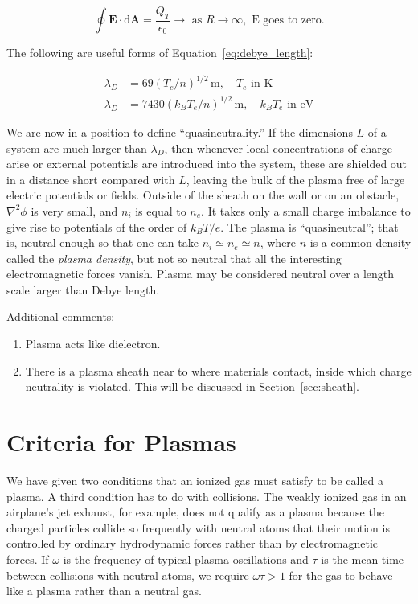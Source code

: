 \documentclass[
  notoc %
]{tufte-book}
\providecommand{\tightlist}{%
  \setlength{\itemsep}{0pt}\setlength{\parskip}{0pt}
}
\begin{document}
\[
\oint\mathbf{E}\cdot \mathrm{d}\mathbf{A}=\frac{Q_T}{\epsilon_0}\rightarrow\textrm{ as }R\rightarrow \infty, \textrm{ E goes to zero.}
\]

The following are useful forms of Equation~\ref{eq:debye_length}:

\[
\begin{aligned}
\lambda_D &= 69 (T_e/n)^{1/2}\,\text{m},\quad T_e \text{ in K} \\
\lambda_D &= 7430 (k_B T_e/n)^{1/2}\,\text{m},\quad k_BT_e \text{ in eV}
\end{aligned}
\]

We are now in a position to define ``quasineutrality.'' If the
dimensions \(L\) of a system are much larger than \(\lambda_D\), then
whenever local concentrations of charge arise or external potentials are
introduced into the system, these are shielded out in a distance short
compared with \(L\), leaving the bulk of the plasma free of large
electric potentials or fields. Outside of the sheath on the wall or on
an obstacle, \(\nabla^2\phi\) is very small, and \(n_i\) is equal to
\(n_e\). It takes only a small charge imbalance to give rise to
potentials of the order of \(k_BT/e\). The plasma is ``quasineutral'';
that is, neutral enough so that one can take \(n_i\simeq n_e\simeq n\),
where \(n\) is a common density called the \emph{plasma density}, but
not so neutral that all the interesting electromagnetic forces vanish.
Plasma may be considered neutral over a length scale larger than Debye
length.

Additional comments:

\begin{enumerate}
\def\labelenumi{\arabic{enumi}.}
\tightlist
\item
  Plasma acts like dielectron.
\item
  There is a plasma sheath near to where materials contact, inside which
  charge neutrality is violated. This will be discussed in
  Section~\ref{sec:sheath}.
\end{enumerate}

\hypertarget{criteria-for-plasmas}{%
\section{Criteria for Plasmas}\label{criteria-for-plasmas}}

We have given two conditions that an ionized gas must satisfy to be
called a plasma. A third condition has to do with collisions. The weakly
ionized gas in an airplane's jet exhaust, for example, does not qualify
as a plasma because the charged particles collide so frequently with
neutral atoms that their motion is controlled by ordinary hydrodynamic
forces rather than by electromagnetic forces. If \(\omega\) is the
frequency of typical plasma oscillations and \(\tau\) is the mean time
between collisions with neutral atoms, we require \(\omega \tau > 1\)
for the gas to behave like a plasma rather than a neutral gas.
\end{document}
